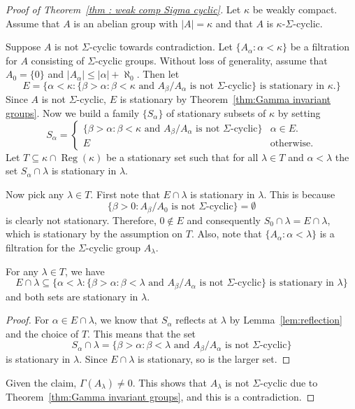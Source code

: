 \documentclass[10pt,a4paper]{amsart}
\DeclareMathOperator{\Reg}{Reg}
\begin{document}
    \begin{proof}[Proof of Theorem~\ref{thm : weak comp Sigma cyclic}]
    Let \(\kappa\) be weakly compact. Assume that \(A\) is an abelian group with \(|A| = \kappa\) and that \(A\) is \(\kappa\)-\(\Sigma\)-cyclic.

    
    Suppose \(A\) is not \(\Sigma\)-cyclic towards contradiction.
        Let \(\{A_\alpha: \alpha<\kappa\}\) be a filtration for \(A\) consisting of \(\Sigma\)-cyclic groups.
        Without loss of generality, assume that \(A_0 = \{0\}\) and \(|A_\alpha|\leq{|\alpha|+\aleph_0}\). Then let
        \[
        E = \{\alpha<\kappa :
        \{ \beta>\alpha : \beta<\kappa \text{ and } A_\beta/A_\alpha\text{ is not \(\Sigma\)-cyclic}\}
        \text{ is stationary in \(\kappa\)}.
        \}
        \]
        Since \(A\) is not \(\Sigma\)-cyclic, \(E\) is stationary by Theorem~\ref{thm:Gamma invariant groups}. Now we build a family \(\{S_\alpha\}\) of stationary subsets of \(\kappa\)  by setting
        \[
        S_\alpha =
        \begin{cases}
            \{\beta>\alpha : \beta<\kappa \text{ and } A_\beta/A_\alpha \text{ is not \(\Sigma\)-cyclic}\} &\alpha \in E.\\
            E &\text{otherwise}.
        \end{cases}
        \]
        Let \(T\subseteq \kappa \cap \Reg(\kappa)\) be a stationary set such that for all \(\lambda\in T\) and \(\alpha<\lambda\) the set \(S_\alpha\cap \lambda\) is stationary in \(\lambda\).

        Now pick any \(\lambda \in T\). First note that \(E\cap \lambda\) is stationary in \(\lambda\). This is because 
        \[\{\beta>0 : A_\beta / A_0\text{ is not \(\Sigma\)-cyclic}\} = \emptyset\] is clearly not stationary. Therefore, \(0 \notin E\) and consequently
        \(S_0\cap \lambda = E\cap \lambda\), which is stationary by the assumption on \(T\). Also, note that \(\{A_\alpha: \alpha<\lambda\}\) is a filtration for the \(\Sigma\)-cyclic group \(A_\lambda\).

        \begin{claim}For any \(\lambda \in T\), we have
            \[E\cap \lambda \subseteq \{ \alpha<\lambda : \{ \beta>\alpha: \beta<\lambda \text{ and \(A_\beta/A_\alpha\) is not \(\Sigma\)-cyclic}\} \text{ is stationary in } \lambda \}\] and both sets are stationary in $\lambda$.
        \end{claim}

        \begin{proof}
            For \(\alpha \in E\cap \lambda\), we know that \(S_\alpha\) reflects at \(\lambda\) by Lemma~\ref{lem:reflection} and the choice of \(T\). This means that the set
            \[S_\alpha \cap \lambda  = \{\beta > \alpha : \beta <\lambda \text{ and } A_\beta/A_\alpha \text{ is not \(\Sigma\)-cyclic}\}
            \]
            is stationary in \(\lambda\). Since \(E\cap \lambda\) is stationary, so is the larger set.
        \end{proof}

         Given the claim, \(\Gamma(A_\lambda)\neq 0\). This shows that \(A_\lambda\) is not \(\Sigma\)-cyclic due to Theorem~\ref{thm:Gamma invariant groups}, and this is a contradiction.
    \end{proof}
\end{document}
